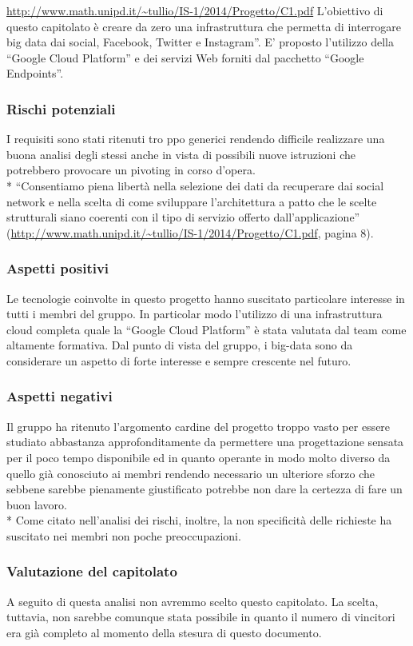\url{http://www.math.unipd.it/~tullio/IS-1/2014/Progetto/C1.pdf}
L’obiettivo di questo capitolato è creare da zero una infrastruttura che permetta di interrogare big data dai social, Facebook, Twitter e Instagram”.
E’ proposto l’utilizzo della “Google Cloud Platform” e dei servizi Web forniti dal pacchetto “Google Endpoints”. 

\subsubsection{Rischi potenziali}
I requisiti sono stati ritenuti tro ppo generici  rendendo difficile realizzare una buona analisi degli stessi anche in vista di possibili nuove istruzioni che potrebbero provocare un pivoting in corso d’opera. \\*
“Consentiamo piena libertà nella selezione dei dati da recuperare dai social network e nella scelta di come sviluppare l’architettura a patto che le scelte strutturali siano coerenti con il tipo di servizio offerto dall’applicazione” (\url{http://www.math.unipd.it/~tullio/IS-1/2014/Progetto/C1.pdf}, pagina 8).

\subsubsection{Aspetti positivi}
Le tecnologie coinvolte in questo progetto hanno suscitato particolare interesse in tutti i membri del gruppo. In particolar modo l’utilizzo di una infrastruttura cloud completa quale la “Google Cloud Platform” è stata valutata dal team come altamente formativa. Dal punto di vista del gruppo, i big-data sono da considerare un aspetto di forte interesse e sempre crescente nel futuro.

\subsubsection{Aspetti negativi}
Il gruppo ha ritenuto l’argomento cardine del progetto troppo vasto per essere studiato abbastanza approfonditamente da permettere una progettazione sensata per il poco tempo disponibile ed in quanto operante in modo molto diverso da quello già conosciuto ai membri rendendo necessario un ulteriore sforzo che sebbene sarebbe pienamente giustificato potrebbe non dare la certezza di fare un buon lavoro. \\*
Come citato nell’analisi dei rischi, inoltre, la non specificità delle richieste  ha suscitato nei membri non poche preoccupazioni.


\subsubsection{Valutazione del capitolato} 

A seguito di questa analisi non avremmo scelto questo capitolato. La scelta, tuttavia, non sarebbe comunque stata possibile in quanto il numero di vincitori era già completo al momento della stesura di questo documento.
